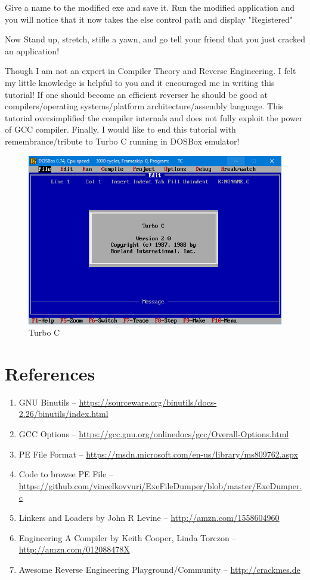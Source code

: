 \documentclass{article}
\begin{document}
Give a name to the modified exe and save it. Run the modified application and you will notice that it now takes the else control path and display "Registered"

Now Stand up, stretch, stifle a yawn, and go tell your friend that you just cracked an application!

Though I am not an expert in Compiler Theory and Reverse Engineering. I felt my little knowledge is helpful to you and it encouraged me in writing this tutorial! If one should become an efficient reverser he should be good at compilers/operating systems/platform architecture/assembly language. This tutorial oversimplified the compiler internals and does not fully exploit the power of GCC compiler. Finally, I would like to end this tutorial with remembrance/tribute to Turbo C running in DOSBox emulator!
\begin{figure}[H]
\centering
\includegraphics[width=\textwidth]{TurboC.png}
\caption{Turbo C}
\end{figure}
\section{References}
\begin{enumerate}[noitemsep]
\item GNU Binutils – \url{https://sourceware.org/binutils/docs-2.26/binutils/index.html}
\item GCC Options – \url{https://gcc.gnu.org/onlinedocs/gcc/Overall-Options.html}
\item PE File Format – \url{https://msdn.microsoft.com/en-us/library/ms809762.aspx}
\item Code to browse PE File – \url{https://github.com/vineelkovvuri/ExeFileDumper/blob/master/ExeDumper.c}
\item Linkers and Loaders by John R Levine – \url{http://amzn.com/1558604960}
\item Engineering A Compiler by Keith Cooper, Linda Torczon – \url{http://amzn.com/012088478X}
\item Awesome Reverse Engineering Playground/Community – \url{http://crackmes.de}
\end{enumerate}
\end{document}
